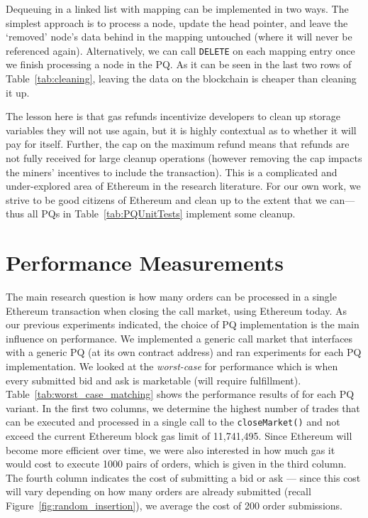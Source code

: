Dequeuing in a linked list with mapping can be implemented in two ways. The simplest approach is to process a node, update the head pointer, and leave the `removed' node's data behind in the mapping untouched (where it will never be referenced again). Alternatively, we can call \texttt{DELETE} on each mapping entry once we finish processing a node in the PQ. As it can be seen in the last two rows of Table~\ref{tab:cleaning}, leaving the data on the blockchain is cheaper than cleaning it up.

The lesson here is that gas refunds incentivize developers to clean up storage variables they will not use again, but it is highly contextual as to whether it will pay for itself. Further, the cap on the maximum refund means that refunds are not fully received for large cleanup operations (however removing the cap impacts the miners' incentives to include the transaction). This is a complicated and under-explored area of Ethereum in the research literature. For our own work, we strive to be good citizens of Ethereum and clean up to the extent that we can---thus all PQs in Table~\ref{tab:PQUnitTests} implement some cleanup.







 \section{\cm Performance Measurements}

 


The main research question is how many orders can be processed in a single Ethereum transaction when closing the call market, using Ethereum today. As our previous experiments indicated, the choice of PQ implementation is the main influence on performance. We implemented a generic call market that interfaces with a generic PQ (at its own contract address) and ran experiments for each PQ implementation. We looked at the \textit{worst-case} for performance which is when every submitted bid and ask is marketable (\ie will require fulfillment). Table~\ref{tab:worst_case_matching} shows the performance results of \cm for each PQ variant. In the first two columns, we determine the highest number of trades that can be executed and processed in a single call to the \texttt{closeMarket()} and not exceed the current Ethereum block gas limit of 11,741,495. Since Ethereum will become more efficient over time, we were also interested in how much gas it would cost to execute 1000 pairs of orders, which is given in the third column. The fourth column indicates the cost of submitting a bid or ask --- since this cost will vary depending on how many orders are already submitted (recall Figure~\ref{fig:random_insertion}), we average the cost of 200 order submissions.

